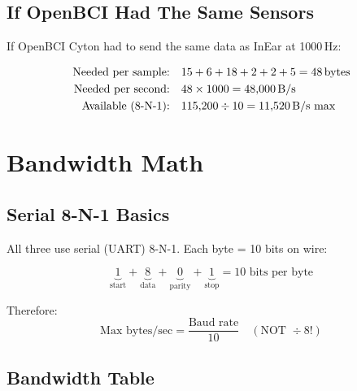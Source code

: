 \documentclass[11pt,a4paper]{article}
\begin{document}
\subsection{If OpenBCI Had The Same Sensors}

If OpenBCI Cyton had to send the same data as InEar at 1000\,Hz:

\begin{align}
\text{Needed per sample:}\quad & 15 + 6 + 18 + 2 + 2 + 5 = 48 \text{\,bytes} \nonumber\\
\text{Needed per second:}\quad & 48 \times 1000 = 48{,}000 \text{\,B/s} \nonumber\\
\text{Available (8-N-1):}\quad & 115{,}200 \div 10 = 11{,}520 \text{\,B/s max} \nonumber
\end{align}

\section{Bandwidth Math}
\label{sec:bandwidth}

\subsection{Serial 8-N-1 Basics}

All three use serial (UART) 8-N-1. Each byte = 10 bits on wire:

\[
\underbrace{1}_{\text{start}} + \underbrace{8}_{\text{data}} + \underbrace{0}_{\text{parity}} + \underbrace{1}_{\text{stop}} = 10 \text{ bits per byte}
\]

Therefore:
\[
\text{Max bytes/sec} = \frac{\text{Baud rate}}{10} \quad(\text{NOT } \div 8\text{!})
\]

\subsection{Bandwidth Table}
\end{document}

